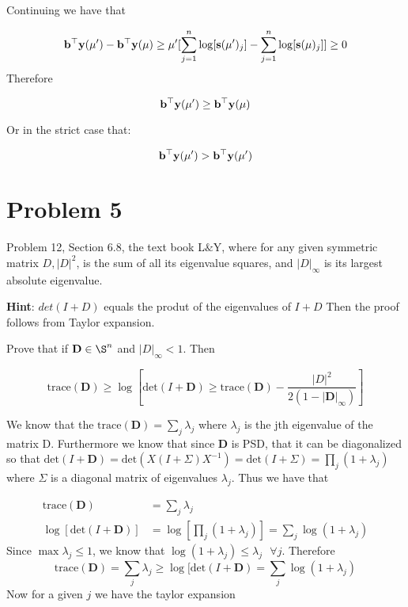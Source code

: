 \documentclass{article} %
\newcommand{\B}[1]{\mathbf{#1}}
\renewcommand\b{{\bf b}}
\renewcommand\b{{\bf b}}
\newcommand\y{{\bf y}}
\newcommand\s{{\bf s}}
\begin{document}
\begin{itemize}
Continuing we have that 


\begin{equation*}
\begin{aligned}
\b^{\top} \y(\mu')  - \b^{\top} \y(\mu)   & \geq    \mu' [ \sum_{j=1}^{n} \log[\s(\mu')_j]  -  \sum_{j=1}^{n} \log[\s(\mu)_j] ] \geq 0 \\
\end{aligned}
\end{equation*}
Therefore 

\[
\b^{\top} \y(\mu')  \geq \b^{\top} \y(\mu)   
\]


Or in the strict case that:

\[
\b^{\top} \y(\mu')  >  \b^{\top} \y(\mu')
\]




\end{itemize}
\section*{Problem 5}

Problem 12, Section 6.8, the text book L$\&$Y, where for any given symmetric matrix $D,|D|^2$, is the sum of all its eigenvalue squares, and $|D|_{\infty}$ is its largest absolute eigenvalue.

\textbf{Hint}: $det(I + D)$ equals the produt of the eigenvalues of $I + D$ Then the proof follows from Taylor expansion. 


Prove that if $\B{D} \in \S^n$ and $|D|_{\infty} < 1$. Then 

\[
\mbox{trace}(\B{D}) \geq \log[ \mbox{det}(I + \B{D}) \geq \mbox{trace}(\B{D}) - \frac{|D|^2}{2( 1 - |\B{D}|_{\infty})}]
\]

We know that the $\mbox{trace}(\B{D}) = \sum_{j} \lambda_j$ where $\lambda_j$ is the jth eigenvalue of the matrix D. Furthermore we know that since $\B{D}$ is PSD, that it can be diagonalized so that $ \mbox{det}(I + \B{D}) =  \mbox{det}(X( I + \Sigma) X^{-1}) =\mbox{det}(I + \Sigma) = \prod_{j} (1 + \lambda_j)$ where $\Sigma $ is a diagonal matrix of eigenvalues $\lambda_j$. Thus we have that 

\begin{equation*}
\begin{aligned}
\mbox{trace}(\B{D}) &= \sum_j \lambda_j \\ 
\log[ \mbox{det} (I + \B{D}) ] &= \log[\prod_{j} ( 1 + \lambda_j)] = \sum_{j} \log( 1 + \lambda_j)
\end{aligned}
\end{equation*}
Since $\max \lambda_j \leq 1$, we know that $ \log( 1 + \lambda_j) \leq \lambda_j \mbox{ } \forall j$. Therefore
\[
\mbox{trace}(\B{D}) = \sum_j \lambda_j \geq  \log[ \mbox{det}(I + \B{D}) = \sum_{j} \log( 1 + \lambda_j)
\]
Now for a given $j$ we have the taylor expansion
\end{document}
